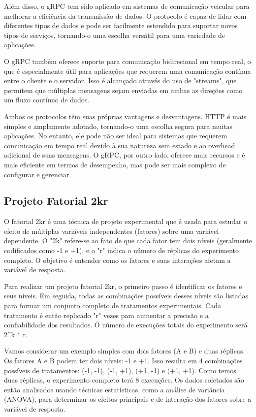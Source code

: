Além disso, o gRPC tem sido aplicado em sistemas de comunicação veicular para melhorar a eficiência da transmissão de dados\cite{hawbani2021fuzzy}. O protocolo é capaz de lidar com diferentes tipos de dados e pode ser facilmente estendido para suportar novos tipos de serviços, tornando-o uma escolha versátil para uma variedade de aplicações.

O gRPC também oferece suporte para comunicação bidirecional em tempo real, o que é especialmente útil para aplicações que requerem uma comunicação contínua entre o cliente e o servidor. Isso é alcançado através do uso de "streams", que permitem que múltiplas mensagens sejam enviadas em ambas as direções como um fluxo contínuo de dados.

Ambos os protocolos têm suas próprias vantagens e desvantagens. HTTP é mais simples e amplamente adotado, tornando-o uma escolha segura para muitas aplicações. No entanto, ele pode não ser ideal para sistemas que requerem comunicação em tempo real devido à sua natureza sem estado e ao overhead adicional de suas mensagens. O gRPC, por outro lado, oferece mais recursos e é mais eficiente em termos de desempenho, mas pode ser mais complexo de configurar e gerenciar\cite{grpc2015high}.

\subsection{Projeto Fatorial 2kr}

O fatorial 2kr é uma técnica de projeto experimental que é usada para estudar o efeito de múltiplas variáveis independentes (fatores) sobre uma variável dependente. O "2k" refere-se ao fato de que cada fator tem dois níveis (geralmente codificados como -1 e +1), e o "r" indica o número de réplicas do experimento completo. O objetivo é entender como os fatores e suas interações afetam a variável de resposta\cite{montgomery2017design}.

Para realizar um projeto fatorial 2kr, o primeiro passo é identificar os fatores e seus níveis. Em seguida, todas as combinações possíveis desses níveis são listadas para formar um conjunto completo de tratamentos experimentais. Cada tratamento é então replicado "r" vezes para aumentar a precisão e a confiabilidade dos resultados. O número de execuções totais do experimento será 2^k * r\cite{box2005statistics}.

Vamos considerar um exemplo simples com dois fatores (A e B) e duas réplicas. Os fatores A e B podem ter dois níveis: -1 e +1. Isso resulta em 4 combinações possíveis de tratamentos: (-1, -1), (-1, +1), (+1, -1) e (+1, +1). Como temos duas réplicas, o experimento completo terá 8 execuções. Os dados coletados são então analisados usando técnicas estatísticas, como a análise de variância (ANOVA), para determinar os efeitos principais e de interação dos fatores sobre a variável de resposta\cite{wasserman2004all}.

